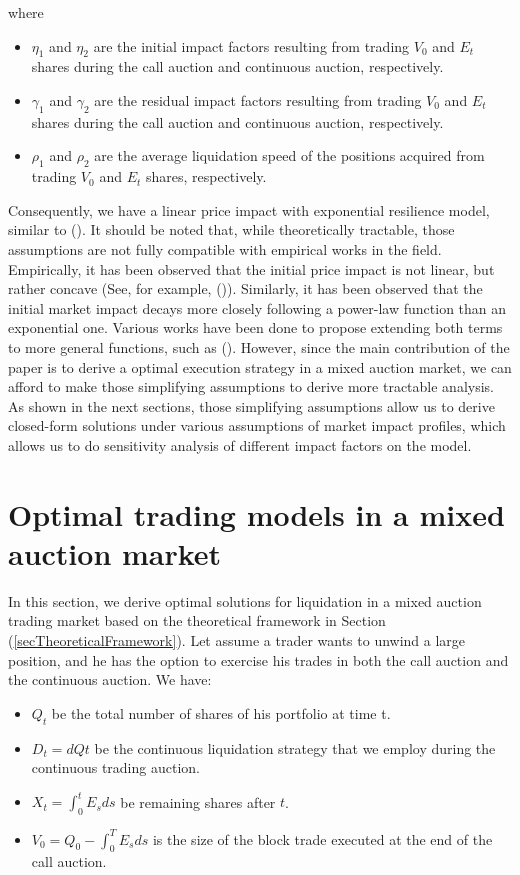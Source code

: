\documentclass{article}
\begin{document}
where
\begin{itemize}
  \item $\eta_1$ and $\eta_2$ are the initial impact factors resulting from trading $V_0$ and $E_t$ shares during the call auction and continuous auction, respectively.
  \item $\gamma_1$ and $\gamma_2$ are the residual impact factors resulting from trading $V_0$ and $E_t$ shares during the call auction and continuous auction, respectively.
  \item $\rho_1$ and $\rho_2$ are the average liquidation speed of the positions acquired from trading $V_0$ and $E_t$ shares, respectively.
\end{itemize}

Consequently, we have a linear price impact with exponential resilience model, similar to (\cite{Obizhaeva2013}). It should be noted that, while theoretically tractable, those assumptions are not fully compatible with empirical works in the field. Empirically, it has been observed that the initial price impact is not linear, but rather concave (See, for example, (\cite{Eisler2009})). Similarly, it has been observed that the initial market impact decays more closely following a power-law function than an exponential one. Various works have been done to propose extending both terms to more general functions, such as (\cite{Alfonsi2010}). However, since the main contribution of the paper is to derive a optimal execution strategy in a mixed auction market, we can afford to make those simplifying assumptions to derive more tractable analysis. As shown in the next sections, those simplifying assumptions allow us to derive closed-form solutions under various assumptions of market impact profiles, which allows us to do sensitivity analysis of different impact factors on the model.

\section{Optimal trading models in a mixed auction market}\label{secModel}

In this section, we derive optimal solutions for liquidation in a mixed auction trading market based on the theoretical framework in Section (\ref{secTheoreticalFramework}). Let assume a trader wants to unwind a large position, and he has the option to exercise his trades in both the call auction and the continuous auction. We have:

\begin{itemize}
  \item $Q_t$ be the total number of shares of his portfolio at time t.
  \item $D_t=dQt$ be the continuous liquidation strategy that we employ during the continuous trading auction.
  \item $X_t=\int_0^t E_s ds$ be remaining shares after $t$.
  \item $V_0=Q_0 - \int_0^T E_s ds$ is the size of the block trade executed at the end of the call auction.
\end{itemize}
\end{document}
